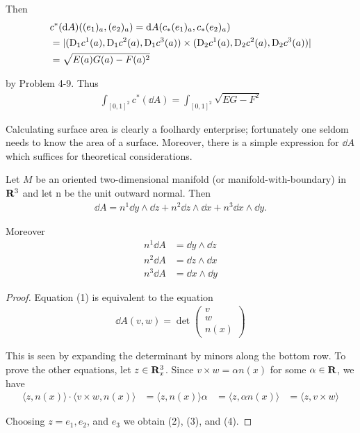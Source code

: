 Then 
\begin{align*}
    & c^*(\mathrm{d} A)((e_1)_a, (e_2)_a) = \mathrm{d} A(c_*(e_1)_a, c_*(e_2)_a) \\
    & = |(\mathrm{D}_1c^1(a), \mathrm{D}_1c^2(a), \mathrm{D}_1c^3(a)) \times (\mathrm{D}_2c^1(a), \mathrm{D}_2c^2(a), \mathrm{D}_2c^3(a))| \\
    & = \sqrt{E(a)G(a) - F(a)^2}
\end{align*}

by Problem 4-9. Thus 
\begin{align*}
    \int_{[0,1]^2} c^*(\dd A) = \int_{[0,1]^2} \sqrt{EG-F^2}
\end{align*}

Calculating surface area is clearly a foolhardy enterprise;
fortunately one seldom needs to know the area of a surface.
Moreover, there is a simple expression for $\dd A$ which suffices for
theoretical considerations.

\begin{theorem}
    Let $M$ be an oriented two-dimensional manifold (or manifold-with-boundary) in $\mathbf{R}^3$ 
    and let n be the unit outward normal. Then
    \begin{align}
        \dd A=n^1\dd y\wedge\dd z+n^2\dd z\wedge\dd x+n^3\dd x\wedge\dd y.
    \end{align}

    Moreover 
    \begin{align}
        n^1\dd A & = \dd y\wedge \dd z\\
        n^2\dd A & = \dd z\wedge \dd x\\
        n^3\dd A & = \dd x\wedge \dd y
    \end{align}
\end{theorem}

\begin{proof}
    Equation (1) is equivalent to the equation
    \begin{align*}
        \dd A(v, w) = \det 
        \begin{pmatrix}
            v\\ w\\ n(x)
        \end{pmatrix}
    \end{align*}

    This is seen by expanding the determinant by minors along the bottom row.
    To prove the other equations, let $z\in\mathbf{R}^3_x$. Since $v\times w=\alpha n(x)$ for some 
    $\alpha\in\mathbf{R}$, we have 
    \begin{align*}
        \langle z, n(x)\rangle\cdot \langle v\times w, n(x)\rangle
        & = \langle z, n(x)\rangle\alpha 
        & = \langle z, \alpha n(x)\rangle
        & = \langle z, v\times w\rangle
    \end{align*}

    Choosing $z=e_1, e_2$, and $e_3$ we obtain (2), (3), and (4).
\end{proof}


